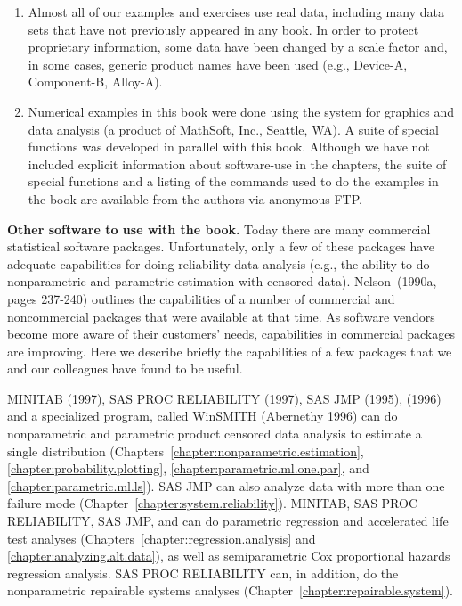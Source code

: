 \begin{enumerate}
\item
Almost all of our examples and exercises use real data, including many data
sets that have not previously appeared in any book. In order to
protect proprietary information, some data have been changed by a scale
factor and, in some cases, generic product names have been used (e.g.,
Device-A, Component-B, Alloy-A).

\item
Numerical examples in this book were done using the \splus
system for graphics and data analysis (a product of MathSoft, Inc.,
Seattle, WA).  A suite of special \splus functions was developed in
parallel with this book.  Although we have not included explicit
information about software-use in the chapters, the suite of special
\splus functions and a listing of the \splus commands used to do the
examples in the book are available from the authors via anonymous FTP.
\end{enumerate}

\noindent
{\bf Other software to use with the book.} Today there are many
commercial statistical software packages.  Unfortunately, only a few
of these packages have adequate capabilities for doing reliability
data analysis (e.g., the ability to do nonparametric and parametric
estimation with censored data). Nelson~(1990a, pages 237-240) outlines
the capabilities of a number of commercial and noncommercial packages
that were available at that time. As software vendors become more
aware of their customers' needs, capabilities in commercial packages
are improving. Here we describe briefly the capabilities of a few
packages that we and our colleagues have found to be useful.

MINITAB (1997), SAS PROC RELIABILITY (1997), SAS JMP (1995), \splus
(1996) and a specialized program, called WinSMITH (Abernethy 1996)
can do nonparametric and parametric product censored data analysis
to estimate a single distribution
(Chapters~\ref{chapter:nonparametric.estimation},
\ref{chapter:probability.plotting},
\ref{chapter:parametric.ml.one.par},
and \ref{chapter:parametric.ml.ls}).  SAS JMP can also analyze data
with more than one failure mode
(Chapter~\ref{chapter:system.reliability}).  MINITAB, SAS PROC
RELIABILITY, SAS JMP, and \splus can do parametric regression and
accelerated life test analyses
(Chapters~\ref{chapter:regression.analysis} and
\ref{chapter:analyzing.alt.data}), as well as semiparametric Cox
proportional hazards regression analysis.  SAS PROC RELIABILITY can,
in addition, do the nonparametric repairable systems analyses
(Chapter~\ref{chapter:repairable.system}).\\[3ex]

